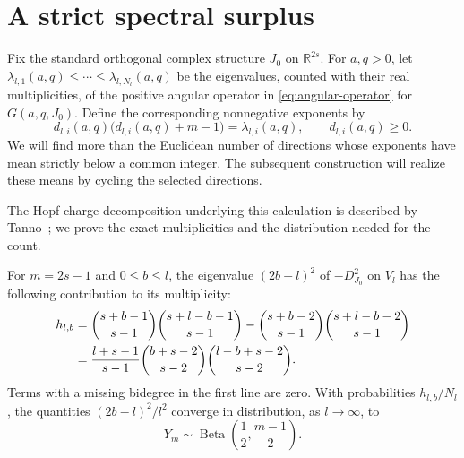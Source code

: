 \section{A strict spectral surplus}\label{sec:counting}

Fix the standard orthogonal complex structure $J_0$ on $\mathbb R^{2s}$.
For $a,q>0$, let
$\lambda_{l,1}(a,q)\le\cdots\le\lambda_{l,N_l}(a,q)$
be the eigenvalues, counted with their real multiplicities, of the positive
angular operator in \eqref{eq:angular-operator} for $G(a,q,J_0)$.
Define the corresponding nonnegative exponents by
\begin{equation}\label{eq:dwell-exponents}
 d_{l,i}(a,q)\bigl(d_{l,i}(a,q)+m-1\bigr)=\lambda_{l,i}(a,q),
 \qquad d_{l,i}(a,q)\ge0.
\end{equation}
We will find more than the Euclidean number of directions whose exponents
have mean strictly below a common integer. The subsequent construction
will realize these means by cycling the selected directions.

The Hopf-charge decomposition underlying this calculation is described
by Tanno~\cite[Lemmas~3.1 and~4.1]{Tanno}; we prove the exact
multiplicities and the distribution needed for the count.

\begin{lemma}\label{lem:hopf-distribution}
For $m=2s-1$ and $0\le b\le l$, the eigenvalue $(2b-l)^2$ of
$-D_{J_0}^2$ on $V_l$ has the following contribution to its multiplicity:
\begin{align}
 h_{l,b}
 &=\binom{s+b-1}{s-1}\binom{s+l-b-1}{s-1}
   -\binom{s+b-2}{s-1}\binom{s+l-b-2}{s-1} \label{eq:hopf-multiplicity}\\
 &=\frac{l+s-1}{s-1}
   \binom{b+s-2}{s-2}\binom{l-b+s-2}{s-2}.\notag
\end{align}
Terms with a missing bidegree in the first line are zero.
With probabilities $h_{l,b}/N_l$, the quantities $(2b-l)^2/l^2$
converge in distribution, as $l\to\infty$, to
\[
 Y_m\sim\operatorname{Beta}\left(\frac12,\frac{m-1}{2}\right).
\]
\end{lemma}

